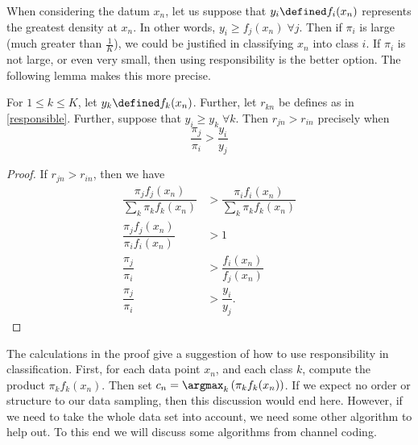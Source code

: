 When considering the datum $x_n$, let us suppose that $y_i\defined f_i(x_n)$ represents the greatest density at $x_n$.   In other words, $y_i\geq f_j(x_n)\;\forall j$.  Then if $\pi_i$ is large (much greater than $\frac{1}{K}$), we could be justified in classifying $x_n$ into class $i$.   If $\pi_i$ is not large, or even very small, then using responsibility is the better option.  The following lemma makes this more precise.

\begin{lemm}
For $1\leq k\leq K$, let $y_k\defined f_k(x_n)$.  Further, let $r_{kn}$ be defines as in \ref{responsible}.  Further, suppose that $y_i\geq y_k \;\forall k$. Then $r_{jn}>r_{in}$ precisely when 
\[\dfrac{\pi_j}{\pi_i}>\dfrac{y_i}{y_j}\]
\end{lemm}
\begin{proof}
If $r_{jn}>r_{in}$, then we have 
\begin{align*}
\dfrac{\pi_j f_j(x_n)}{\sum_{k}\pi_k f_k(x_n)}&>\dfrac{\pi_i f_i(x_n)}{\sum_{k}\pi_k f_k(x_n)}\\
\dfrac{\pi_j f_j(x_n)}{\pi_i f_i(x_n)}&>1\\
\dfrac{\pi_j}{\pi_i}&>\dfrac{f_i(x_n)}{f_j(x_n)}\\
\dfrac{\pi_j}{\pi_i}&>\dfrac{y_i}{y_j}.
\end{align*}
\end{proof}

The calculations in the proof give a suggestion of how to use responsibility in classification.  First, for each data point $x_n$, and each class $k$, compute the product $\pi_k f_k(x_n)$.  Then set $c_n=\argmax_k\left(\pi_k f_k(x_n)\right)$.
If we expect no order or structure to our data sampling, then this discussion would end here.  However, if we need to take the whole data set into account, we need some other algorithm to help out.  To this end  we will discuss some algorithms from channel coding.